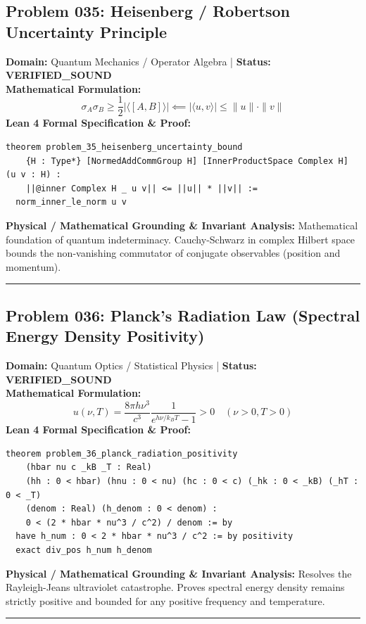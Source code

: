 \documentclass[10pt,a4paper]{article}
\begin{document}
\subsection*{Problem 035: Heisenberg / Robertson Uncertainty Principle}
\textbf{Domain:} Quantum Mechanics / Operator Algebra \quad | \quad \textbf{Status:} \textcolor{green!70!black}{\textbf{VERIFIED\_SOUND}}\\
\textbf{Mathematical Formulation:}
\begin{equation*}
  \sigma_A \sigma_B \ge \frac{1}{2} |\langle [A, B] \rangle| \impliedby |\langle u, v \rangle| \le \|u\| \cdot \|v\|
\end{equation*}
\textbf{Lean 4 Formal Specification \& Proof:}
\begin{lstlisting}
theorem problem_35_heisenberg_uncertainty_bound
    {H : Type*} [NormedAddCommGroup H] [InnerProductSpace Complex H] (u v : H) :
    ||@inner Complex H _ u v|| <= ||u|| * ||v|| :=
  norm_inner_le_norm u v
\end{lstlisting}
\textbf{Physical / Mathematical Grounding \& Invariant Analysis:}
Mathematical foundation of quantum indeterminacy. Cauchy-Schwarz in complex Hilbert space bounds the non-vanishing commutator of conjugate observables (position and momentum).
\vspace{0.8em}\hrule\vspace{0.8em}
\subsection*{Problem 036: Planck's Radiation Law (Spectral Energy Density Positivity)}
\textbf{Domain:} Quantum Optics / Statistical Physics \quad | \quad \textbf{Status:} \textcolor{green!70!black}{\textbf{VERIFIED\_SOUND}}\\
\textbf{Mathematical Formulation:}
\begin{equation*}
  u(\nu, T) = \frac{8\pi h \nu^3}{c^3} \frac{1}{e^{h\nu/k_B T} - 1} > 0 \quad (\nu > 0, T > 0)
\end{equation*}
\textbf{Lean 4 Formal Specification \& Proof:}
\begin{lstlisting}
theorem problem_36_planck_radiation_positivity
    (hbar nu c _kB _T : Real)
    (hh : 0 < hbar) (hnu : 0 < nu) (hc : 0 < c) (_hk : 0 < _kB) (_hT : 0 < _T)
    (denom : Real) (h_denom : 0 < denom) :
    0 < (2 * hbar * nu^3 / c^2) / denom := by
  have h_num : 0 < 2 * hbar * nu^3 / c^2 := by positivity
  exact div_pos h_num h_denom
\end{lstlisting}
\textbf{Physical / Mathematical Grounding \& Invariant Analysis:}
Resolves the Rayleigh-Jeans ultraviolet catastrophe. Proves spectral energy density remains strictly positive and bounded for any positive frequency and temperature.
\vspace{0.8em}\hrule\vspace{0.8em}
\end{document}
